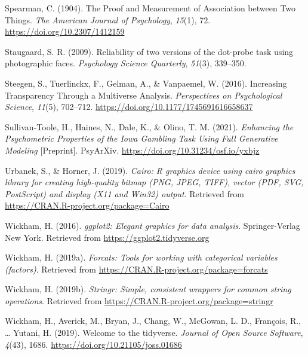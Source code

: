\documentclass[
  man,floatsintext]{apa6}
\newlength{\cslhangindent}
\newlength{\cslentryspacingunit} %
\newenvironment{CSLReferences}[2] %
 {%
  \setlength{\parindent}{0pt}
  \ifodd #1
  \let\oldpar\par
  \def\par{\hangindent=\cslhangindent\oldpar}
  \fi
  \setlength{\parskip}{#2\cslentryspacingunit}
 }%
 {}
\begin{document}
\begin{CSLReferences}{1}{0}
\leavevmode{}%
Spearman, C. (1904). The {Proof} and {Measurement} of {Association} between {Two} {Things}. \emph{The American Journal of Psychology}, \emph{15}(1), 72. \url{https://doi.org/10.2307/1412159}

\leavevmode{}%
Staugaard, S. R. (2009). Reliability of two versions of the dot-probe task using photographic faces. \emph{Psychology Science Quarterly}, \emph{51}(3), 339--350.

\leavevmode{}%
Steegen, S., Tuerlinckx, F., Gelman, A., \& Vanpaemel, W. (2016). Increasing {Transparency} {Through} a {Multiverse} {Analysis}. \emph{Perspectives on Psychological Science}, \emph{11}(5), 702--712. \url{https://doi.org/10.1177/1745691616658637}

\leavevmode{}%
Sullivan-Toole, H., Haines, N., Dale, K., \& Olino, T. M. (2021). \emph{Enhancing the {Psychometric} {Properties} of the {Iowa} {Gambling} {Task} {Using} {Full} {Generative} {Modeling}} {[}Preprint{]}. PsyArXiv. \url{https://doi.org/10.31234/osf.io/yxbjz}

\leavevmode{}%
Urbanek, S., \& Horner, J. (2019). \emph{Cairo: R graphics device using cairo graphics library for creating high-quality bitmap (PNG, JPEG, TIFF), vector (PDF, SVG, PostScript) and display (X11 and Win32) output}. Retrieved from \url{https://CRAN.R-project.org/package=Cairo}

\leavevmode{}%
Wickham, H. (2016). \emph{ggplot2: Elegant graphics for data analysis}. Springer-Verlag New York. Retrieved from \url{https://ggplot2.tidyverse.org}

\leavevmode{}%
Wickham, H. (2019a). \emph{Forcats: Tools for working with categorical variables (factors)}. Retrieved from \url{https://CRAN.R-project.org/package=forcats}

\leavevmode{}%
Wickham, H. (2019b). \emph{Stringr: Simple, consistent wrappers for common string operations}. Retrieved from \url{https://CRAN.R-project.org/package=stringr}

\leavevmode{}%
Wickham, H., Averick, M., Bryan, J., Chang, W., McGowan, L. D., François, R., \ldots{} Yutani, H. (2019). Welcome to the {tidyverse}. \emph{Journal of Open Source Software}, \emph{4}(43), 1686. \url{https://doi.org/10.21105/joss.01686}


\end{CSLReferences}
\end{document}
